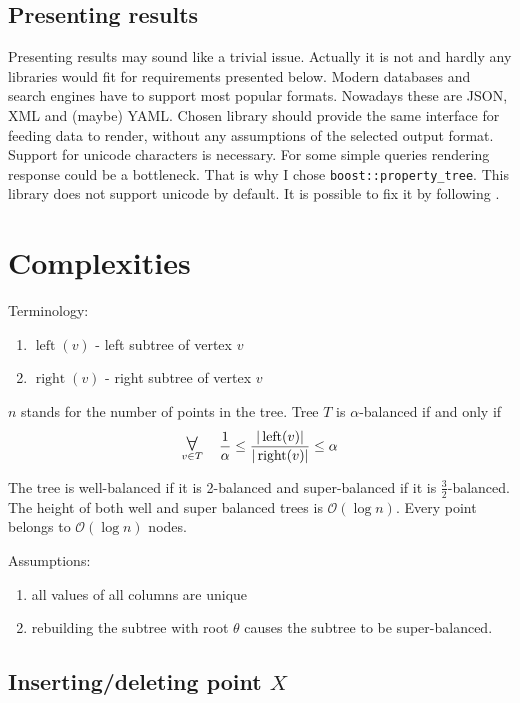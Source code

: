 \documentclass[10pt,a4paper]{article}
\DeclareMathOperator{\rightSon}{right}
\DeclareMathOperator{\leftSon}{left}
\newcommand{\Oh}{\mathcal{O}}
\newcommand\bigforall{\mbox{\Large $\mathsurround0pt\forall$}}
\begin{document}
\subsection{Presenting results}

Presenting results may sound like a trivial issue. Actually it is not and hardly any libraries would fit for requirements presented below. Modern databases and search engines have to support most popular formats. Nowadays these are JSON, XML and (maybe) YAML. Chosen library should provide the same interface for feeding data to render, without any assumptions of the selected output format. Support for unicode characters is necessary. For some simple queries rendering response could be a bottleneck. That is why I chose \verb|boost::property_tree|. This library does not support unicode by default. It is possible to fix it by following \cite{SOANS} .

\section{Complexities}

Terminology:
\begin{enumerate}
\item $\leftSon(v)$ - left subtree of vertex $v$
\item $\rightSon(v)$ - right subtree of vertex $v$
\end{enumerate}

$n$ stands for the number of points in the tree. Tree $T$ is $\alpha$-balanced if and only if 
$$\displaystyle\mathop{\bigforall}_{v\in T} \quad \frac{1}{\alpha} \leq \frac{|\leftSon(v)|}{|\rightSon(v)|} \leq \alpha$$

The tree is well-balanced if it is 2-balanced and super-balanced if it is  $\frac{3}{2}$-balanced. The height of both well and super balanced trees is $\Oh(\log n)$. Every point belongs to $\Oh(\log n)$ nodes. 

Assumptions:
\begin{enumerate}
\item all values of all columns are unique
\item rebuilding the subtree with root $\theta$ causes the subtree to be super-balanced.
\end{enumerate}

\subsection{Inserting/deleting point $X$}
\end{document}
